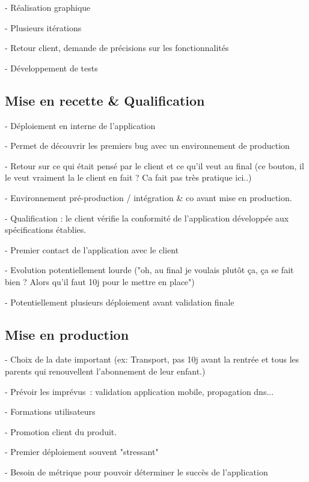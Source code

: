 - Réalisation graphique

- Plusieurs itérations

- Retour client, demande de précisions sur les fonctionnalités

- Développement de tests


\subsection{Mise en recette \& Qualification}

- Déploiement en interne de l'application

- Permet de découvrir les premiers bug avec un environnement de production

- Retour sur ce qui était pensé par le client et ce qu'il veut au final (ce bouton, il le veut vraiment la le client en fait ? Ca fait pas très pratique ici..)

- Environnement pré-production / intégration \& co avant mise en production.


- Qualification : le client vérifie la conformité de l’application développée aux spécifications établies.

- Premier contact de l'application avec le client

- Evolution potentiellement lourde ("oh, au final je voulais plutôt ça, ça se fait bien ? Alors qu'il faut 10j pour le mettre en place")

- Potentiellement plusieurs déploiement avant validation finale

\subsection{Mise en production}

- Choix de la date important (ex: Transport, pas 10j avant la rentrée et tous les parents qui renouvellent l'abonnement de leur enfant.)

- Prévoir les imprévus : validation application mobile, propagation dns...

- Formations utilisateurs

- Promotion client du produit.

- Premier déploiement souvent "stressant"

- Besoin de métrique pour pouvoir déterminer le succès de l'application


